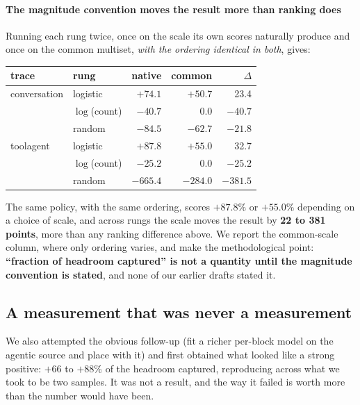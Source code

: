 \paragraph{The magnitude convention moves the result more than ranking does}
Running each rung twice, once on the scale its own scores naturally produce and once on the common
multiset, \emph{with the ordering identical in both}, gives:

\begin{center}\small
\begin{tabular}{@{}llrrr@{}}
\toprule
trace & rung & native & common & $\Delta$ \\
\midrule
conversation & logistic & $+74.1$ & $+50.7$ & 23.4 \\
             & $\log$(count) & $-40.7$ & $0.0$ & $-40.7$ \\
             & random   & $-84.5$ & $-62.7$ & $-21.8$ \\
\midrule
toolagent    & logistic & $+87.8$ & $+55.0$ & 32.7 \\
             & $\log$(count) & $-25.2$ & $0.0$ & $-25.2$ \\
             & random   & $-665.4$ & $-284.0$ & $-381.5$ \\
\bottomrule
\end{tabular}
\end{center}

\medskip
\noindent The same policy, with the same ordering, scores $+87.8\%$ or $+55.0\%$ depending on a choice of
scale, and across rungs the scale moves the result by \textbf{22 to 381 points}, more than any ranking
difference above. We report the common-scale column, where only ordering varies, and make the
methodological point: \textbf{``fraction of headroom captured'' is not a quantity until the magnitude
convention is stated}, and none of our earlier drafts stated it.




\subsection{A measurement that was never a measurement}
\label{sec:sampling}
We also attempted the obvious follow-up (fit a richer per-block model on the agentic source and place
with it) and first obtained what looked like a strong positive: $+66$ to $+88\%$ of the headroom
captured, reproducing across what we took to be two samples. It was not a result, and the way it failed is
worth more than the number would have been.

